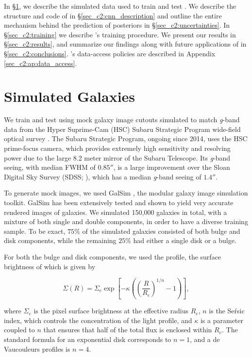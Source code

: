 In \S \ref{sec_c2:sim_data}, we describe the simulated data used to train and test \gampen{}. We describe the structure and code of \gampen{} in \S \ref{sec_c2:cnn_description} and outline the entire mechanism behind the prediction of posteriors in \S \ref{sec_c2:uncertainties}. In \S \ref{sec_c2:training} we describe \gampen{}'s training procedure. We present our results in \S \ref{sec_c2:results}, and summarize our findings along with future applications of \gampen{} in \S \ref{sec_c2:conclusions}. \gampen{}'s data-access policies are described in Appendix  \ref{sec_c2:ap:data_access}. 

\section{Simulated Galaxies} \label{sec_c2:sim_data}
We train and test \gampen{} using mock galaxy image cutouts simulated to match \textit{g}-band data from the Hyper Suprime-Cam (HSC) Subaru Strategic Program wide-field optical survey \citep{hsc_pdr1}. The Subaru Strategic Program, ongoing since 2014, uses the HSC prime-focus camera, which provides extremely high sensitivity and resolving power due to the large 8.2 meter mirror of the Subaru Telescope. Its \textit{g}-band seeing, with median FWHM of $0.85''$, is a large improvement over the Sloan Digital Sky Survey (SDSS; \citealp{sdss_tech_summary}), which has a median \textit{g}-band seeing of $1.4''$.

To generate mock images, we used GalSim \citep{Rowe2015GalSim:Toolkit}, the modular galaxy image simulation toolkit. GalSim has been extensively tested and shown to yield very accurate rendered images of galaxies. We simulated 150,000 galaxies in total, with a mixture of both single and double components, in order to have a diverse training sample. To be exact, $75\%$ of the simulated galaxies consisted of both bulge and disk components, while the remaining $25\%$ had either a single disk or a bulge. 

For both the bulge and disk components, we used the \sersic{} profile, the surface brightness of which is given by  

\begin{equation}
\Sigma(R) = \Sigma_e \exp \left[ -\kappa \left( \left( \frac{R}{R_e}\right)^{1/n} - 1 \right) \right] ,
\label{eq_c2:sersic_fn}
\end{equation}

\noindent
where $\Sigma_e$ is the pixel surface brightness at the effective radius $R_e$, $n$ is the Se\'rsic index, which controls the concentration of the light profile, and $\kappa$ is a parameter coupled to $n$ that ensures that half of the total flux is enclosed within $R_e$.
The standard formula for an exponential disk corresponds to $n=1$, and a de\,Vaucouleurs profiles is $n=4$.

